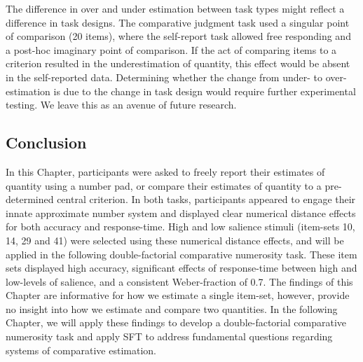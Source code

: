 The difference in over and under estimation between task types might reflect a difference in task designs. The comparative judgment task used a singular point of comparison (20 items), where the self-report task allowed free responding and a post-hoc imaginary point of comparison. If the act of comparing items to a criterion resulted in the underestimation of quantity, this effect would be absent in the self-reported data. Determining whether the change from under- to over-estimation is due to the change in task design would require further experimental testing. We leave this as an avenue of future research. 

\subsection{Conclusion}
In this Chapter, participants were asked to freely report their estimates of quantity using a number pad, or compare their estimates of quantity to a pre-determined central criterion. In both tasks, participants appeared to engage their innate approximate number system and displayed clear numerical distance effects for both accuracy and response-time. High and low salience stimuli (item-sets 10, 14, 29 and 41) were selected using these numerical distance effects, and will be applied in the following double-factorial comparative numerosity task. These item sets displayed high accuracy, significant effects of response-time between high and low-levels of salience, and a consistent Weber-fraction of 0.7. The findings of this Chapter are informative for how we estimate a single item-set, however, provide no insight into how we estimate and compare two quantities. In the following Chapter, we will apply these findings to develop a double-factorial comparative numerosity task and apply SFT to address fundamental questions regarding systems of comparative estimation.
\color{black}





